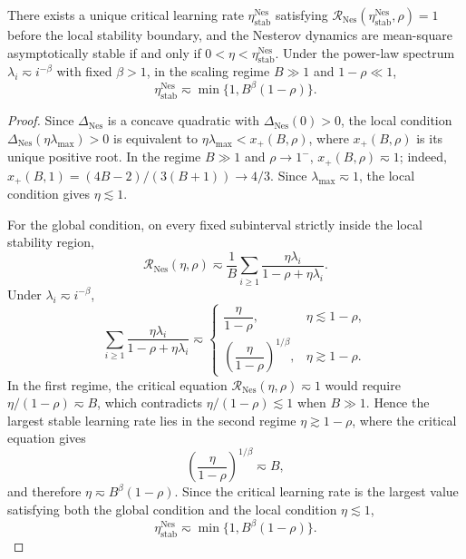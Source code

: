\begin{corollary}
\label{app:cor:nesterov-critical-learning-rate}
There exists a unique critical learning rate \(\eta_{\mathrm{stab}}^{\mathrm{Nes}}\) satisfying \(\mathcal R_{\mathrm{Nes}}(\eta_{\mathrm{stab}}^{\mathrm{Nes}},\rho)=1\) before the local stability boundary, and the Nesterov dynamics are mean-square asymptotically stable if and only if \(0<\eta<\eta_{\mathrm{stab}}^{\mathrm{Nes}}\). Under the power-law spectrum \(\lambda_i\eqsim i^{-\beta}\) with fixed \(\beta>1\), in the scaling regime \(B\gg1\) and \(1-\rho\ll1\),
\begin{equation}
\label{app:eq:nesterov-critical-scaling}
\eta_{\mathrm{stab}}^{\mathrm{Nes}}\eqsim\min\{1,B^\beta(1-\rho)\}.
\end{equation}
\end{corollary}
\begin{proof}
Since \(\Delta_{\mathrm{Nes}}\) is a concave quadratic with \(\Delta_{\mathrm{Nes}}(0)>0\), the local condition \(\Delta_{\mathrm{Nes}}(\eta\lambda_{\max})>0\) is equivalent to \(\eta\lambda_{\max}<x_+(B,\rho)\), where \(x_+(B,\rho)\) is its unique positive root. In the regime \(B\gg1\) and \(\rho\to1^-\), \(x_+(B,\rho)\eqsim1\); indeed, \(x_+(B,1)=(4B-2)/(3(B+1))\to4/3\). Since \(\lambda_{\max}\eqsim1\), the local condition gives \(\eta\lesssim1\).

For the global condition, on every fixed subinterval strictly inside the local stability region,
\[
\mathcal R_{\mathrm{Nes}}(\eta,\rho)\eqsim\frac1B\sum_{i\geq1}\frac{\eta\lambda_i}{1-\rho+\eta\lambda_i}.
\]
Under \(\lambda_i\eqsim i^{-\beta}\),
\[
\sum_{i\geq1}\frac{\eta\lambda_i}{1-\rho+\eta\lambda_i}
\eqsim
\begin{cases}
\dfrac{\eta}{1-\rho}, & \eta\lesssim1-\rho,\\[2mm]
\left(\dfrac{\eta}{1-\rho}\right)^{1/\beta}, & \eta\gtrsim1-\rho.
\end{cases}
\]
In the first regime, the critical equation \(\mathcal R_{\mathrm{Nes}}(\eta,\rho)\eqsim1\) would require \(\eta/(1-\rho)\eqsim B\), which contradicts \(\eta/(1-\rho)\lesssim1\) when \(B\gg1\). Hence the largest stable learning rate lies in the second regime \(\eta\gtrsim1-\rho\), where the critical equation gives
\[
\left(\frac{\eta}{1-\rho}\right)^{1/\beta}\eqsim B,
\]
and therefore \(\eta\eqsim B^\beta(1-\rho)\). Since the critical learning rate is the largest value satisfying both the global condition and the local condition \(\eta\lesssim1\),
\[
\eta_{\mathrm{stab}}^{\mathrm{Nes}}\eqsim\min\{1,B^\beta(1-\rho)\}.
\]
\end{proof}



